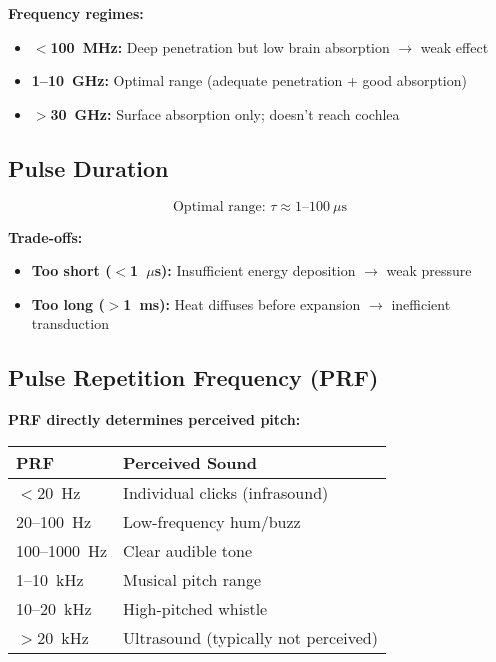 \textbf{Frequency regimes:}
\begin{itemize}
\item \textbf{$<$100~MHz:} Deep penetration but low brain absorption $\rightarrow$ weak effect
\item \textbf{1--10~GHz:} Optimal range (adequate penetration + good absorption)
\item \textbf{$>$30~GHz:} Surface absorption only; doesn't reach cochlea
\end{itemize}

\subsection{Pulse Duration}

\begin{equation}
\text{Optimal range: } \tau \approx 1\text{--}100~\mu\text{s}
\label{eq:frey-pulse-width}
\end{equation}

\textbf{Trade-offs:}
\begin{itemize}
\item \textbf{Too short ($<$1~$\mu$s):} Insufficient energy deposition $\rightarrow$ weak pressure
\item \textbf{Too long ($>$1~ms):} Heat diffuses before expansion $\rightarrow$ inefficient transduction
\end{itemize}

\subsection{Pulse Repetition Frequency (PRF)}

\textbf{PRF directly determines perceived pitch:}

\begin{center}
\begin{tabular}{@{}ll@{}}
\toprule
\textbf{PRF} & \textbf{Perceived Sound} \\
\midrule
$<$20~Hz & Individual clicks (infrasound) \\
20--100~Hz & Low-frequency hum/buzz \\
100--1000~Hz & Clear audible tone \\
1--10~kHz & Musical pitch range \\
10--20~kHz & High-pitched whistle \\
$>$20~kHz & Ultrasound (typically not perceived) \\
\bottomrule
\end{tabular}
\end{center}

